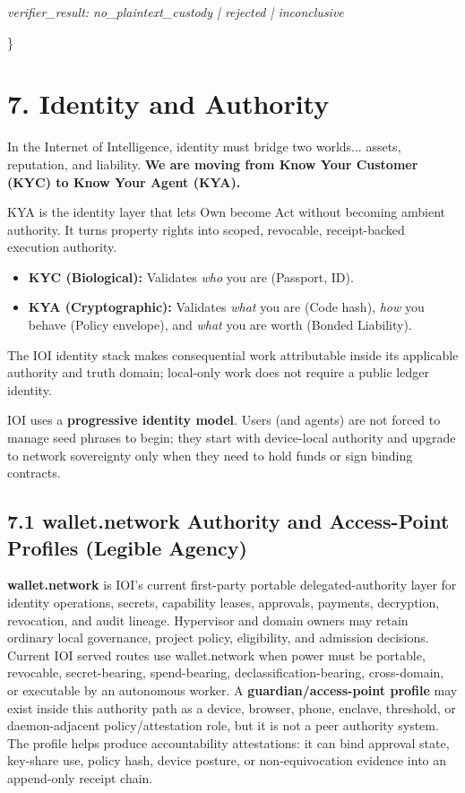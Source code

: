 \documentclass[
  11pt,
]{article}
\providecommand{\tightlist}{%
  \setlength{\itemsep}{0pt}\setlength{\parskip}{0pt}}
\begin{document}
\emph{verifier\_result: no\_plaintext\_custody | rejected | inconclusive}

\}

\hypertarget{identity-and-authority}{%
\section{7. Identity and Authority}\label{identity-and-authority}}

In the Internet of Intelligence, identity must bridge two worlds...
assets, reputation, and liability. \textbf{We are moving from Know Your
Customer (KYC) to Know Your Agent (KYA).}

KYA is the identity layer that lets Own become Act without becoming
ambient authority. It turns property rights into scoped, revocable,
receipt-backed execution authority.

\begin{itemize}
\tightlist
\item
  \textbf{KYC (Biological):} Validates \emph{who} you are (Passport,
  ID).
\item
  \textbf{KYA (Cryptographic):} Validates \emph{what} you are (Code
  hash), \emph{how} you behave (Policy envelope), and \emph{what} you
  are worth (Bonded Liability).
\end{itemize}

The IOI identity stack makes consequential work attributable inside its
applicable authority and truth domain; local-only work does not require a
public ledger identity.

IOI uses a \textbf{progressive identity model}. Users (and agents) are
not forced to manage seed phrases to begin; they start with device-local
authority and upgrade to network sovereignty only when they need to hold
funds or sign binding contracts.

\hypertarget{wallet.network-authority-and-access-point-profiles-legible-agency}{%
\subsection{7.1 wallet.network Authority and Access-Point Profiles (Legible
Agency)}\label{wallet.network-authority-and-access-point-profiles-legible-agency}}

\textbf{wallet.network} is IOI's current first-party portable
delegated-authority layer for
identity operations, secrets, capability leases, approvals, payments,
decryption, revocation, and audit lineage. Hypervisor and domain owners may
retain ordinary local governance, project policy, eligibility, and admission
decisions. Current IOI served routes use wallet.network when power must be portable,
revocable, secret-bearing, spend-bearing, declassification-bearing,
cross-domain, or executable by an autonomous worker. A
\textbf{guardian/access-point profile} may exist inside this
authority path as a device, browser, phone, enclave, threshold, or
daemon-adjacent policy/attestation role, but it is not a peer authority
system. The profile helps produce accountability attestations:
it can bind approval state, key-share use, policy hash, device posture,
or non-equivocation evidence into an append-only receipt chain.
\end{document}
